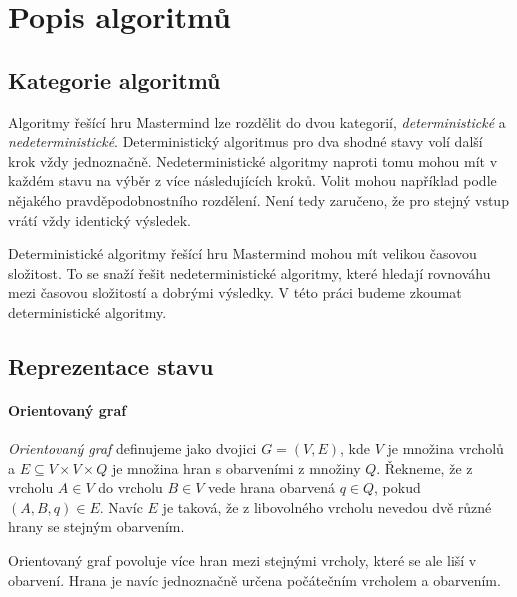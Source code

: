 \chapter{Popis algoritmů}
\section{Kategorie algoritmů}
Algoritmy řešící hru Mastermind lze rozdělit do dvou kategorií, \emph{deterministické} a \emph{nedeterministické}. Deterministický algoritmus pro dva shodné stavy volí další krok vždy jednoznačně. 
Nedeterministické algoritmy naproti tomu mohou mít v každém stavu na výběr z více následujících kroků. Volit mohou například podle nějakého pravděpodobnostního rozdělení. Není tedy zaručeno, že pro stejný vstup vrátí vždy identický výsledek.

Deterministické algoritmy řešící hru Mastermind mohou mít velikou časovou složitost. To se snaží řešit nedeterministické algoritmy, které hledají rovnováhu mezi časovou složitostí a dobrými výsledky. 
V této práci budeme zkoumat deterministické algoritmy. 


\section{Reprezentace stavu}


\subsubsection{Orientovaný graf}

\begin{definice}
    \emph{Orientovaný graf} definujeme jako dvojici $G = (V,E)$, kde $V$ je množina vrcholů a $E \subseteq V\times V \times Q$ je množina hran s obarveními z množiny $Q$. 
    Řekneme, že z vrcholu $A \in V$ do vrcholu $B \in V$ vede hrana obarvená $q \in Q$, pokud $(A,B,q) \in E$. Navíc $E$ je taková, že z libovolného vrcholu nevedou dvě různé hrany se stejným obarvením.
\end{definice}
\begin{pozn}
    Orientovaný graf povoluje více hran mezi stejnými vrcholy, které se ale liší v obarvení. Hrana je navíc jednoznačně určena počátečním vrcholem a obarvením.
\end{pozn}

